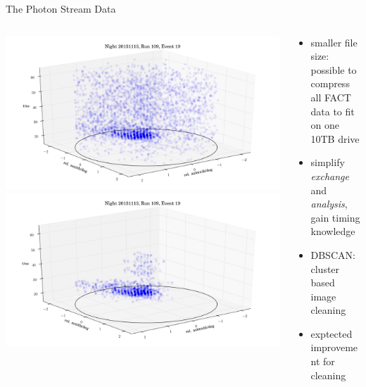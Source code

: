 \begin{frame}[t]{The Photon Stream Data}
\begin{columns}[onlytextwidth]
    \begin{column}{0.475\textwidth}
        \begin{overprint}
            \includegraphics[width=1.2\textwidth]{fig/event2.png}
            \includegraphics[width=1.2\textwidth]{fig/event1.png}
        \end{overprint}
    \end{column}
    \begin{column}{0.475\textwidth}
        \begin{itemize}
            \vspace*{\fill}
            \item smaller file size: possible to compress all FACT data to fit on one 10TB drive
            \item simplify \textit{exchange} and \textit{analysis}, gain timing knowledge
            \item DBSCAN: cluster based image cleaning
            \item exptected improvement for cleaning
        \end{itemize}
    \end{column}
\end{columns}
\end{frame}



